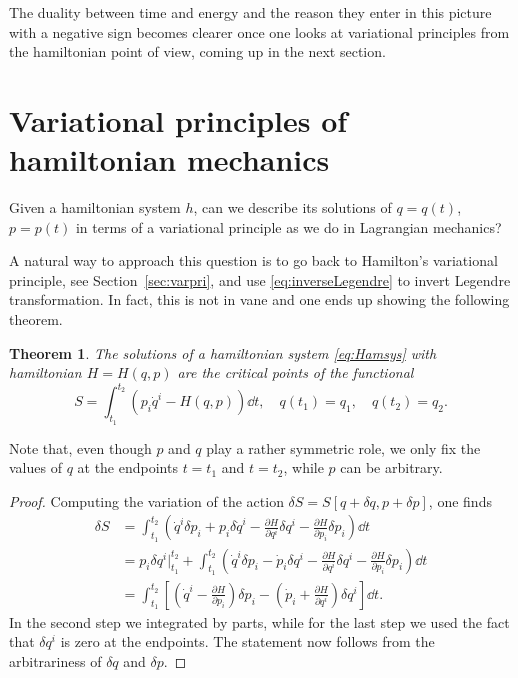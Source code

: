 \documentclass[english,fontsize=11pt,paper=b5]{scrbook}
\newtheorem{theorem}{Theorem}[chapter]
\theoremstyle{definition}
\begin{document}
    The duality between time and energy and the reason they enter in this picture with a negative sign becomes clearer once one looks at variational principles from the hamiltonian point of view, coming up in the next section.

    \section{Variational principles of hamiltonian mechanics}

    Given a hamiltonian system $h$, can we describe its solutions of $q=q(t)$, $p=p(t)$ in terms of a variational principle as we do in Lagrangian mechanics?

    A natural way to approach this question is to go back to Hamilton's variational principle, see Section~\ref{sec:varpri}, and use \eqref{eq:inverseLegendre} to invert Legendre transformation.
    In fact, this is not in vane and one ends up showing the following theorem.

    \begin{theorem}\label{thm:variationalHamilton}
      The solutions of a hamiltonian system \eqref{eq:Hamsys} with hamiltonian $H=H(q,p)$ are the critical points of the functional
      \begin{equation}\label{eq:variationalHamilton}
        S = \int_{t_1}^{t_2} \left(p_i\dot q^i - H(q,p)\right) \dd t,
        \quad q(t_1) = q_1, \quad q(t_2) = q_2.
      \end{equation}
    \end{theorem}
    Note that, even though $p$ and $q$ play a rather symmetric role, we only fix the values of $q$ at the endpoints $t=t_1$ and $t=t_2$, while $p$ can be arbitrary.

    \begin{proof}
      Computing the variation of the action $\delta S = S[q+\delta q, p + \delta p]$, one finds
      \begin{align}
        \delta S
     & = \int_{t_1}^{t_2} \left( \dot q^i \delta p_i + p_i \delta \dot q^i - \frac{\partial H}{\partial q^i}\delta q^i - \frac{\partial H}{\partial p_i}\delta p_i \right) \dd t                                   \\
     & = p_i \delta q^i\Big|_{t_1}^{t_2} + \int_{t_1}^{t_2} \left( \dot q^i \delta p_i - \dot p_i \delta q^i - \frac{\partial H}{\partial q^i}\delta q^i - \frac{\partial H}{\partial p_i}\delta p_i \right) \dd t \\
     & = \int_{t_1}^{t_2} \left[
       \left(\dot q^i - \frac{\partial H}{\partial p_i} \right) \delta p_i
       - \left(\dot p_i + \frac{\partial H}{\partial q^i}\right) \delta q^i
     \right] \dd t.
      \end{align}
      In the second step we integrated by parts, while for the last step we used the fact that $\delta q^i$ is zero at the endpoints.
      The statement now follows from the arbitrariness of $\delta q$ and $\delta p$.
    \end{proof}
\end{document}

